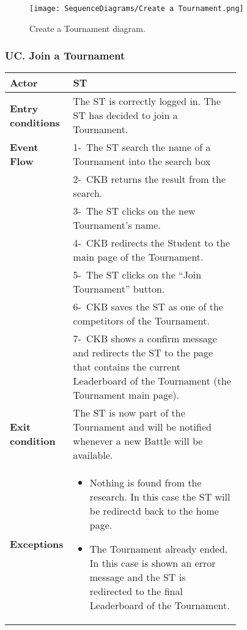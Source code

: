 \begin{figure}[H]
    \begin{center}
        \texttt{[image: SequenceDiagrams/Create a Tournament.png]}
        \caption{Create a Tournament diagram.}
        \label{fig:create_a_Tournament_seqd}%
    \end{center}
\end{figure}

\newpage

\subsubsection*{UC\cuc . Join a Tournament}
\begin{center}
    \begin{longtable}{|l|p{0.75\linewidth}|}
        \hline
        \textbf{Actor}            & ST  \\
        \hline
        \textbf{Entry conditions} & The ST is correctly logged in. The ST has decided to join a Tournament.   \\
        \hline
        \textbf{Event Flow}       & 1-\ The ST search the name of a Tournament into the search box \\
        & 2-\ CKB returns the result from the search. \\
        & 3-\ The ST clicks on the new Tournament’s name.        \\
        & 4-\ CKB redirects the Student to the main page of the Tournament. \\
        & 5-\ The ST clicks on the “Join Tournament” button. \\
        & 6-\ CKB saves the ST as one of the competitors of the Tournament. \\
        & 7-\ CKB shows a confirm message and redirects the ST to the page that contains the current Leaderboard of the Tournament (the Tournament main page). \\
        \hline
        \textbf{Exit condition}   & The ST is now part of the Tournament and will be notified whenever a new Battle will be available.        \\
        \hline
        \textbf{Exceptions}        & \begin{itemize}
            \item Nothing is found from the research. In this case the ST will be redirectd back to the home page.
            \item The Tournament already ended. In this case is shown an error message and the ST is redirected to the final Leaderboard of the Tournament.

\end{itemize}
\end{longtable}
\end{center}
